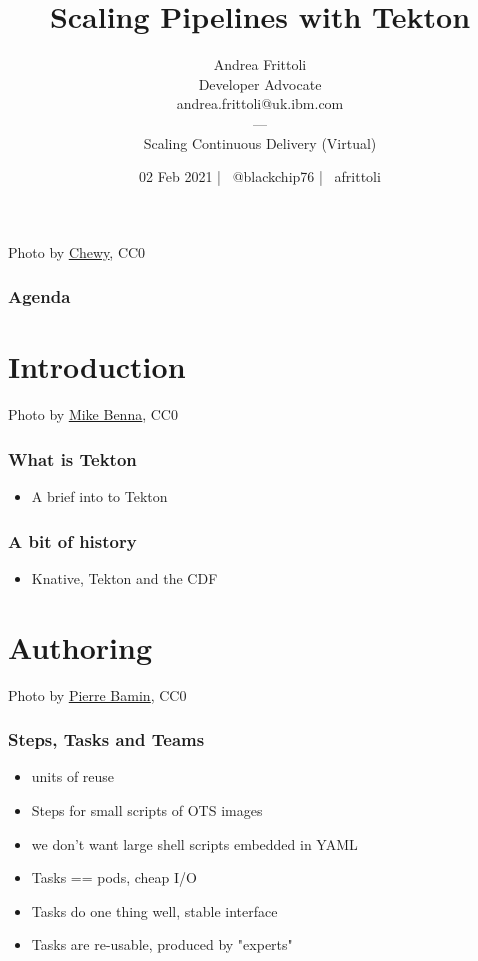 \documentclass[aspectratio=169,11pt,hyperref={colorlinks=true}]{beamer}
\title{Scaling Pipelines with Tekton}
\date[02 Feb 2021]{02 Feb 2021 | \faTwitter ~@blackchip76 | \faGithub ~afrittoli}
\author[Andrea Frittoli]{
  Andrea Frittoli \\
  Developer Advocate \\
  andrea.frittoli@uk.ibm.com \\
  --- \\
  Scaling Continuous Delivery (Virtual)
}
\begin{document}
\begin{frame}
\titlepage{}
\end{frame}

\begin{lpicrblack}{Photo by \href{https://unsplash.com/@chewy}{\underline{Chewy}}, CC0}
  \frametitle{Agenda}
\end{lpicrblack}

\section[Introduction]{Introduction}

\begin{sectionwithpic}{Photo by \href{https://unsplash.com/@mbenna}{\underline{Mike Benna}}, CC0}
\end{sectionwithpic}

\begin{grayframe}
  \frametitle{What is Tekton}
  \begin{itemize}
    \item A brief into to Tekton
  \end{itemize}
\end{grayframe}

\begin{grayframe}
  \frametitle{A bit of history}
  \begin{itemize}
    \item Knative, Tekton and the CDF
  \end{itemize}
\end{grayframe}

\section[Authoring]{Authoring}

\begin{sectionwithpicrx}{Photo by \href{https://unsplash.com/@bamin}{\underline{Pierre Bamin}}, CC0}
\end{sectionwithpicrx}

\begin{grayframe}
  \frametitle{Steps, Tasks and Teams}
  \begin{itemize}
    \item units of reuse
    \item Steps for small scripts of OTS images
    \item we don't want large shell scripts embedded in YAML
    \item Tasks == pods, cheap I/O
    \item Tasks do one thing well, stable interface
    \item Tasks are re-usable, produced by "experts"
  \end{itemize}
\end{grayframe}
\end{document}
